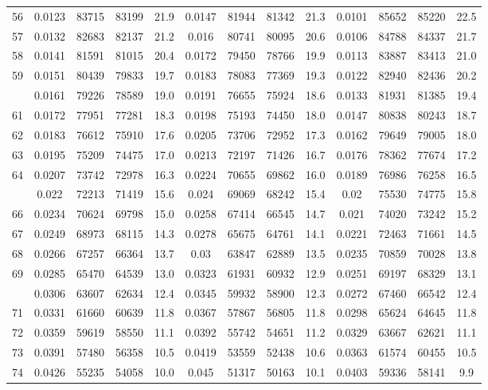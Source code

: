 \documentclass[
  14pt,
]{article}
\begin{document}
\begin{longtable}[t]{lcccccccccccc}
56 & 0.0123 & 83715 & 83199 & 21.9 & 0.0147 & 81944 & 81342 & 21.3 & 0.0101 & 85652 & 85220 & 22.5\\
57 & 0.0132 & 82683 & 82137 & 21.2 & 0.016 & 80741 & 80095 & 20.6 & 0.0106 & 84788 & 84337 & 21.7\\
58 & 0.0141 & 81591 & 81015 & 20.4 & 0.0172 & 79450 & 78766 & 19.9 & 0.0113 & 83887 & 83413 & 21.0\\
59 & 0.0151 & 80439 & 79833 & 19.7 & 0.0183 & 78083 & 77369 & 19.3 & 0.0122 & 82940 & 82436 & 20.2\\
\addlinespace
60 & 0.0161 & 79226 & 78589 & 19.0 & 0.0191 & 76655 & 75924 & 18.6 & 0.0133 & 81931 & 81385 & 19.4\\
61 & 0.0172 & 77951 & 77281 & 18.3 & 0.0198 & 75193 & 74450 & 18.0 & 0.0147 & 80838 & 80243 & 18.7\\
62 & 0.0183 & 76612 & 75910 & 17.6 & 0.0205 & 73706 & 72952 & 17.3 & 0.0162 & 79649 & 79005 & 18.0\\
63 & 0.0195 & 75209 & 74475 & 17.0 & 0.0213 & 72197 & 71426 & 16.7 & 0.0176 & 78362 & 77674 & 17.2\\
64 & 0.0207 & 73742 & 72978 & 16.3 & 0.0224 & 70655 & 69862 & 16.0 & 0.0189 & 76986 & 76258 & 16.5\\
\addlinespace
65 & 0.022 & 72213 & 71419 & 15.6 & 0.024 & 69069 & 68242 & 15.4 & 0.02 & 75530 & 74775 & 15.8\\
66 & 0.0234 & 70624 & 69798 & 15.0 & 0.0258 & 67414 & 66545 & 14.7 & 0.021 & 74020 & 73242 & 15.2\\
67 & 0.0249 & 68973 & 68115 & 14.3 & 0.0278 & 65675 & 64761 & 14.1 & 0.0221 & 72463 & 71661 & 14.5\\
68 & 0.0266 & 67257 & 66364 & 13.7 & 0.03 & 63847 & 62889 & 13.5 & 0.0235 & 70859 & 70028 & 13.8\\
69 & 0.0285 & 65470 & 64539 & 13.0 & 0.0323 & 61931 & 60932 & 12.9 & 0.0251 & 69197 & 68329 & 13.1\\
\addlinespace
70 & 0.0306 & 63607 & 62634 & 12.4 & 0.0345 & 59932 & 58900 & 12.3 & 0.0272 & 67460 & 66542 & 12.4\\
71 & 0.0331 & 61660 & 60639 & 11.8 & 0.0367 & 57867 & 56805 & 11.8 & 0.0298 & 65624 & 64645 & 11.8\\
72 & 0.0359 & 59619 & 58550 & 11.1 & 0.0392 & 55742 & 54651 & 11.2 & 0.0329 & 63667 & 62621 & 11.1\\
73 & 0.0391 & 57480 & 56358 & 10.5 & 0.0419 & 53559 & 52438 & 10.6 & 0.0363 & 61574 & 60455 & 10.5\\
74 & 0.0426 & 55235 & 54058 & 10.0 & 0.045 & 51317 & 50163 & 10.1 & 0.0403 & 59336 & 58141 & 9.9\\

\end{longtable}
\end{document}
